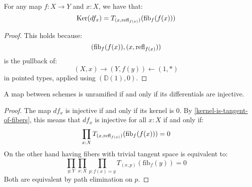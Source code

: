 \begin{lemma}
\label{kernel-is-tangent-of-fibers}
For any map $f:X\to Y$ and $x:X$, we have that:
\[
\mathrm{Ker}(df_x) = T_{(x,\mathrm{refl}_{f(x)})}(\mathrm{fib}_f(f(x)))
\]
\end{lemma}
\begin{proof}
This holds because:
\[
(\mathrm{fib}_f(f(x)),(x,\mathrm{refl}_{f(x)}))
\]
is the pullback of:
\[
(X,x) \to (Y,f(y)) \leftarrow (1,*)
\]
in pointed types, applied using $(\mathbb{D}(1),0)$.
\end{proof}

\begin{proposition}
A map between schemes is unramified if and only if its differentials are injective. 
\end{proposition}
\begin{proof}
The map $df_x$ is injective if and only if its kernel is $0$. By \cref{kernel-is-tangent-of-fibers}, this means that $df_x$ is injective for all $x:X$ if and only if:
\[
\prod_{x:X}T_{(x,\mathrm{refl}_{f(x)})}(\mathrm{fib}_f(f(x)))=0
\]
On the other hand having fibers with trivial tangent space is equivalent to:
\[
\prod_{y:Y}\prod_{x:X}\prod_{p:f(x)=y} T_{(x,p)}(\mathrm{fib}_f(y)) = 0
\]
Both are equivalent by path elimination on $p$.
\end{proof}



